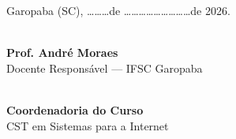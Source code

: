\documentclass[12pt,a4paper]{article}
\begin{document}
\begin{center}
\small
Garopaba (SC), \dots\dots\dots de \dots\dots\dots\dots\dots\dots\dots\dots\dots de 2026.

\vspace{1.8cm}

\begin{minipage}{0.45\textwidth}
\centering
\hrulefill \\
\textbf{Prof. André Moraes}\\
Docente Responsável — IFSC Garopaba
\end{minipage}
\hfill
\begin{minipage}{0.45\textwidth}
\centering
\hrulefill \\
\textbf{Coordenadoria do Curso}\\
CST em Sistemas para a Internet
\end{minipage}
\end{center}
\end{document}
